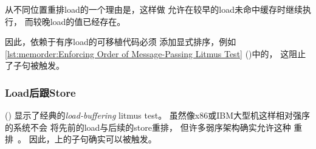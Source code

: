 从不同位置重排load的一个理由是，这样做
允许在较早的load未命中缓存时继续执行，
而较晚load的值已经存在。

\QuickQuizEnd

\begin{listing}

\caption{强制消息传递Litmus Test的排序}
\label{lst:memorder:Enforcing Order of Message-Passing Litmus Test}
\end{listing}

\begin{fcvref}
因此，依赖于有序load的可移植代码必须
添加显式排序，例如\cref{lst:memorder:Enforcing Order of Message-Passing Litmus Test}
()中的，
这阻止了子句被触发。
\end{fcvref}

\begin{listing}

\caption{Load-Buffering 石蕊测试（无排序）}
\label{lst:memorder:Load-Buffering Litmus Test (No Ordering)}
\end{listing}

\subsubsection{Load后跟Store}
\label{sec:memorder:Load Followed By Store}

\begin{fcvref}
()
显示了经典的\emph{load-buffering} litmus test。
虽然像x86或IBM大型机这样相对强序的系统不会
将先前的load与后续的store重排，
但许多弱序架构确实允许这种
重排~\cite{JadeAlglave2011ppcmem}。
因此，上的子句确实可以被触发。
\end{fcvref}

\begin{listing}

\caption{强制Load-Buffering Litmus Test的排序}
\label{lst:memorder:Enforcing Ordering of Load-Buffering Litmus Test}
\end{listing}


